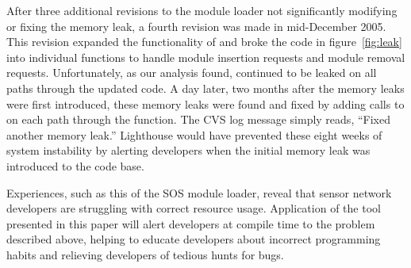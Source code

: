 After three additional revisions to the module loader not significantly
modifying or fixing the memory leak, a fourth revision was made in
mid-December 2005.  
%
This revision expanded the functionality of  and broke the
code in figure~\ref{fig:leak} into individual functions to handle module
insertion requests and module removal requests.
%
Unfortunately, as our analysis found,  continued to be leaked
on all paths through the updated code.
%
A day later, two months after the memory leaks were first introduced, these
memory leaks were found and fixed by adding calls to  on
each path through the function.
%
The CVS log message simply reads, ``Fixed another memory leak.''
%
Lighthouse would have prevented these eight weeks of system instability by
alerting developers when the initial memory leak was introduced to the code
base.



Experiences, such as this of the SOS module loader, reveal that sensor network
developers are struggling with correct resource usage.
%
Application of the tool presented in this paper will alert developers at
compile time to the problem described above, helping to educate developers
about incorrect programming habits and relieving developers of tedious hunts
for bugs.


